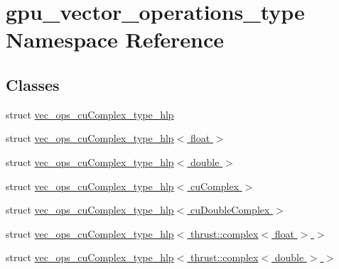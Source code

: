 \hypertarget{namespacegpu__vector__operations__type}{\section{gpu\-\_\-vector\-\_\-operations\-\_\-type Namespace Reference}
\label{namespacegpu__vector__operations__type}
}
\subsection*{Classes}
\begin{DoxyCompactItemize}
\item 
struct \hyperlink{structgpu__vector__operations__type_1_1vec__ops__cuComplex__type__hlp}{vec\-\_\-ops\-\_\-cu\-Complex\-\_\-type\-\_\-hlp}
\item 
struct \hyperlink{structgpu__vector__operations__type_1_1vec__ops__cuComplex__type__hlp_3_01float_01_4}{vec\-\_\-ops\-\_\-cu\-Complex\-\_\-type\-\_\-hlp$<$ float $>$}
\item 
struct \hyperlink{structgpu__vector__operations__type_1_1vec__ops__cuComplex__type__hlp_3_01double_01_4}{vec\-\_\-ops\-\_\-cu\-Complex\-\_\-type\-\_\-hlp$<$ double $>$}
\item 
struct \hyperlink{structgpu__vector__operations__type_1_1vec__ops__cuComplex__type__hlp_3_01cuComplex_01_4}{vec\-\_\-ops\-\_\-cu\-Complex\-\_\-type\-\_\-hlp$<$ cu\-Complex $>$}
\item 
struct \hyperlink{structgpu__vector__operations__type_1_1vec__ops__cuComplex__type__hlp_3_01cuDoubleComplex_01_4}{vec\-\_\-ops\-\_\-cu\-Complex\-\_\-type\-\_\-hlp$<$ cu\-Double\-Complex $>$}
\item 
struct \hyperlink{structgpu__vector__operations__type_1_1vec__ops__cuComplex__type__hlp_3_01thrust_1_1complex_3_01float_01_4_01_4}{vec\-\_\-ops\-\_\-cu\-Complex\-\_\-type\-\_\-hlp$<$ thrust\-::complex$<$ float $>$ $>$}
\item 
struct \hyperlink{structgpu__vector__operations__type_1_1vec__ops__cuComplex__type__hlp_3_01thrust_1_1complex_3_01double_01_4_01_4}{vec\-\_\-ops\-\_\-cu\-Complex\-\_\-type\-\_\-hlp$<$ thrust\-::complex$<$ double $>$ $>$}
\end{DoxyCompactItemize}

